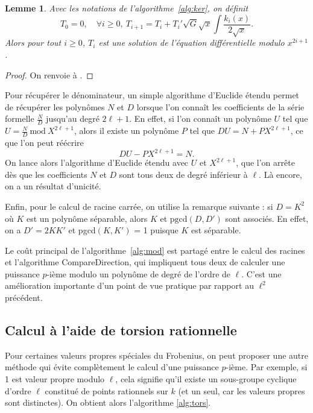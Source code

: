 \documentclass[11pt,a4paper]{article}
\renewcommand{\mod}{\ \mathrm{mod}\ }
\renewcommand{\v}{\vspace{5mm}}
\newtheorem*{lem}{Lemme}
\theoremstyle{definition}
\begin{document}
\begin{lem} Avec les notations de l'algorithme~\ref{alg:ker}, on définit
$$T_0 = 0, \quad \forall i\geq 0,\ T_{i+1} = T_i + T_i' \sqrt{G} \sqrt{x} \int \frac{k_i(x)}{2\sqrt{x}}.$$
Alors pour tout $i\geq 0$, $T_i$ est une solution de l'équation différentielle modulo $x^{2i+1}$.
\end{lem}

\begin{proof}
On renvoie à \cite{LaVa}.
\end{proof}

 Pour récupérer le dénominateur, un simple algorithme d'Euclide étendu permet de récupérer les polynômes $N$ et $D$ lorsque l'on connaît les coefficients de la série formelle $\frac{N}{D}$ jusqu'au degré $2\ell + 1$. En effet, si l'on connaît un polynôme $U$ tel que $U = \frac{N}{D} \mod X^{2\ell + 1}$, alors il existe un polynôme $P$ tel que $D U = N + P X^{2\ell+1}$, ce que l'on peut réécrire
 $$D U - P X^{2\ell + 1} = N.$$
On lance alors l'algorithme d'Euclide étendu avec $U$ et $X^{2\ell + 1}$, que l'on arrête dès que les coefficients $N$ et $D$ sont tous deux de degré inférieur à $\ell$. Là encore, on a un résultat d'unicité.

Enfin, pour le calcul de racine carrée, on utilise la remarque suivante : si $D = K^2$ où $K$ est un polynôme séparable, alors $K$ et $\mathrm{pgcd}(D, D')$ sont associés. En effet, on a $D' = 2 K K'$ et pgcd$(K, K')$ = 1 puisque $K$ est séparable.
\v

Le coût principal de l'algorithme~\ref{alg:mod} est partagé entre le calcul des racines et l'algorithme {\sc CompareDirection}, qui impliquent tous deux de calculer une puissance $p$-ième modulo un polynôme de degré de l'ordre de $\ell$. C'est une amélioration importante d'un point de vue pratique par rapport au $\ell^2$ précédent.

\newpage
\subsection{Calcul à l'aide de torsion rationnelle}

Pour certaines valeurs propres spéciales du Frobenius, on peut proposer une autre méthode qui évite complètement le calcul d'une puissance $p$-ième. Par exemple, si 1 est valeur propre modulo $\ell$, cela signifie qu'il existe un sous-groupe cyclique d'ordre $\ell$ constitué de points rationnels sur $k$ (et un seul, car les valeurs propres sont distinctes). On obtient alors l'algorithme \ref{alg:tors}.
\end{document}
